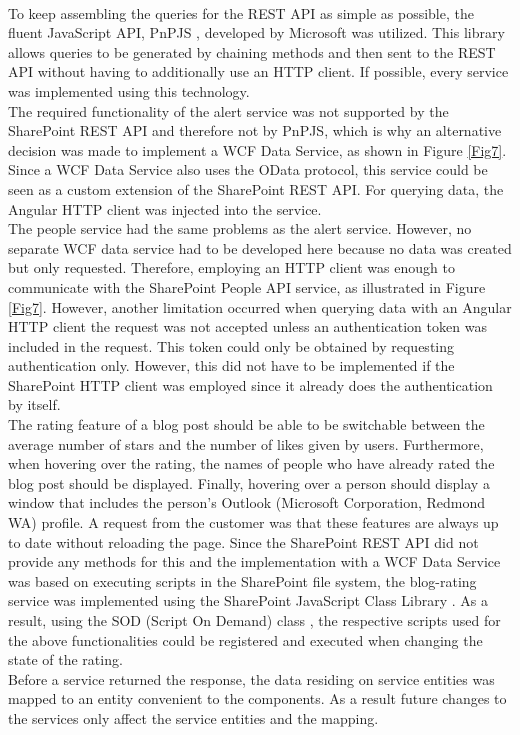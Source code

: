 \documentclass[Bachelor,BIF,english]{twbook}
\begin{document}
\\[\baselineskip]
To keep assembling the queries for the REST API as simple as possible, the fluent JavaScript API, PnPJS \cite{Pnpjs}, developed by Microsoft was utilized. This library allows queries to be generated by chaining methods and then sent to the REST API without having to additionally use an HTTP client. If possible, every service was implemented using this technology.
\\[\baselineskip]
The required functionality of the alert service was not supported by the SharePoint REST API and therefore not by PnPJS, which is why an alternative decision was made to implement a WCF Data Service, as shown in Figure \ref{Fig7}. Since a WCF Data Service also uses the OData protocol, this service could be seen as a custom extension of the SharePoint REST API. For querying data, the Angular HTTP client was injected into the service.
\\[\baselineskip]
The people service had the same problems as the alert service. However, no separate WCF data service had to be developed here because no data was created but only requested. Therefore, employing an HTTP client was enough to communicate with the SharePoint People API service, as illustrated in Figure \ref{Fig7}. However, another limitation occurred when querying data with an Angular HTTP client the request was not accepted unless an authentication token was included in the request. This token could only be obtained by requesting authentication only. However, this did not have to be implemented if the SharePoint HTTP client was employed since it already does the authentication by itself.
\\[\baselineskip]
The rating feature of a blog post should be able to be switchable between the average number of stars and the number of likes given by users. Furthermore, when hovering over the rating, the names of people who have already rated the blog post should be displayed. Finally, hovering over a person should display a window that includes the person's Outlook (Microsoft Corporation, Redmond WA) profile. A request from the customer was that these features are always up to date without reloading the page. Since the SharePoint REST API did not provide any methods for this and the implementation with a WCF Data Service was based on executing scripts in the SharePoint file system, the blog-rating service was implemented using the SharePoint JavaScript Class Library \cite{SpJavaScriptClassLibrary}. As a result, using the SOD (Script On Demand) class \cite{SpSod}, the respective scripts used for the above functionalities could be registered and executed when changing the state of the rating.
\\[\baselineskip]
Before a service returned the response, the data residing on service entities was mapped to an entity convenient to the components. As a result future changes to the services only affect the service entities and the mapping.
\end{document}
